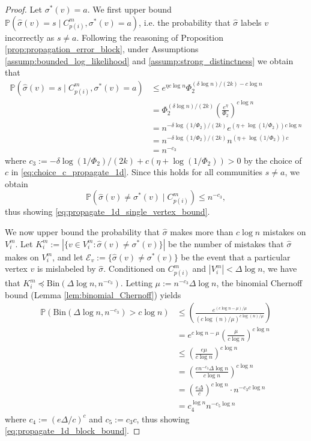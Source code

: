 \documentclass{article}
\renewcommand{\P}{\mathbb{P}}
\newcommand{\1}{\mathbbm{1}}
\newcommand{\calE}{\mathcal{E}}
\theoremstyle{definition}
\theoremstyle{plain}
\begin{document}
\begin{proof}
    Let $\sigma^*(v) = a$. We first upper bound $\P(\hat{\sigma}(v) = s \mid C_{p(i)}^m, \sigma^*(v) = a)$, i.e. the probability that $\hat{\sigma}$ labels $v$ incorrectly as $s \neq a$. Following the reasoning of Proposition \ref{prop:propagation_error_block}, under Assumptions \ref{assump:bounded_log_likelihood} and \ref{assump:strong_distinctness} we obtain that
    \begin{align*}
        \P(\hat{\sigma}(v) = s \mid C_{p(i)}^m, \sigma^*(v) = a) &\leq e^{\eta c \log n} \Phi_2^{(\delta \log n)/(2k) - c \log n} \\
        &= \Phi_2^{(\delta \log n)/(2k)} \left(\frac{e^\eta}{\Phi_2}\right)^{c \log n} \\
        &= n^{-\delta \log(1 / \Phi_2)/(2k)} e^{(\eta + \log(1/\Phi_2))c \log n} \\
        &= n^{-\delta \log(1 / \Phi_2)/(2k)} n^{(\eta + \log(1/\Phi_2))c} \\
        &= n^{-c_3}
    \end{align*}
    where $c_3 := -\delta \log(1 / \Phi_2)/(2k) + c(\eta+\log(1/\Phi_2)) > 0$ by the choice of $c$ in \eqref{eq:choice_c_propagate_1d}. Since this holds for all communities $s \neq a$, we obtain
    \begin{equation*}
        \P(\hat{\sigma}(v) \neq \sigma^*(v) \mid C_{p(i)}^m) \leq n^{-c_3},
    \end{equation*}
    thus showing \eqref{eq:propagate_1d_single_vertex_bound}.

    We now upper bound the probability that $\hat{\sigma}$ makes more than $c \log n$ mistakes on $V_i^m$. Let $K_i^m := |\{v \in V_i^m: \hat{\sigma}(v) \neq \sigma^*(v)\}|$ be the number of mistakes that $\hat{\sigma}$ makes on $V_i^m$, and let $\calE_v := \{\hat{\sigma}(v) \neq \sigma^*(v)\}$ be the event that a particular vertex $v$ is mislabeled by $\hat{\sigma}$. Conditioned on $C_{p(i)}^m$ and $|V_i^m| < \Delta \log n$, we have that $K_i^m \preceq \text{Bin}(\Delta \log n, n^{-c_3})$. Letting $\mu := n^{-c_3} \Delta \log n$, the binomial Chernoff bound (Lemma \ref{lem:binomial_Chernoff}) yields
    \begin{align*}
        \P(\text{Bin}(\Delta \log n, n^{-c_3}) > c \log n) &\leq \left(\frac{e^{(c \log n - \mu) / \mu}}{(c \log(n) / \mu)^{c \log (n) / \mu}}\right) \\
        &= e^{c \log n - \mu} \left(\frac{\mu}{c \log n}\right)^{c \log n} \\
        &\leq \left(\frac{e \mu}{c \log n}\right)^{c \log n} \\
        &= \left(\frac{e n^{-c_3} \Delta \log n}{c \log n}\right)^{c \log n} \\
        &= \left(\frac{e \Delta}{c}\right)^{c \log n} \cdot n^{-c_3 c \log n} \\
        &= c_4^{\log n} n^{-c_5 \log n}
    \end{align*}
    where $c_4 := (e\Delta/c)^c$ and $c_5 := c_3 c$, thus showing \eqref{eq:propagate_1d_block_bound}.
\end{proof}
\end{document}
